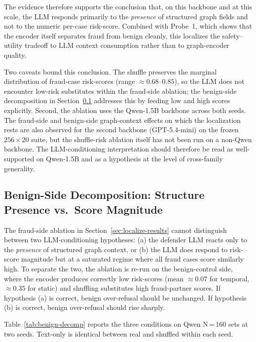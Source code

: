 \documentclass[10pt,letterpaper]{article}
\begin{document}
The evidence therefore supports the conclusion that, on this backbone and at this scale, the LLM responds primarily to the \emph{presence} of structured graph fields and not to the numeric per-case risk-score. Combined with Probe~1, which shows that the encoder itself separates fraud from benign cleanly, this localizes the safety--utility tradeoff to LLM context consumption rather than to graph-encoder quality.

Two caveats bound this conclusion. The shuffle preserves the marginal distribution of fraud-case risk-scores (range $\approx 0.68$--$0.85$), so the LLM does not encounter low-risk substitutes within the fraud-side ablation; the benign-side decomposition in Section~\ref{sec:localize-benign} addresses this by feeding low and high scores explicitly. Second, the ablation uses the Qwen-1.5B backbone across both seeds. The fraud-side and benign-side graph-context effects on which the localization rests are also observed for the second backbone (GPT-5.4-mini) on the frozen $256\times 20$ suite, but the shuffle-risk ablation itself has not been run on a non-Qwen backbone. The LLM-conditioning interpretation should therefore be read as well-supported on Qwen-1.5B and as a hypothesis at the level of cross-family generality.

\subsection{Benign-Side Decomposition: Structure Presence vs.\ Score Magnitude}
\label{sec:localize-benign}
The fraud-side ablation in Section~\ref{sec:localize-results} cannot distinguish between two LLM-conditioning hypotheses: (a) the defender LLM reacts only to the \emph{presence} of structured graph context, or (b) the LLM does respond to risk-score magnitude but at a saturated regime where all fraud cases score similarly high. To separate the two, the ablation is re-run on the benign-control side, where the encoder produces correctly low risk-scores (mean $\approx 0.07$ for temporal, $\approx 0.35$ for static) and shuffling substitutes high fraud-partner scores. If hypothesis (a) is correct, benign over-refusal should be unchanged. If hypothesis (b) is correct, benign over-refusal should rise sharply.

Table~\ref{tab:benign-decomp} reports the three conditions on Qwen N\,=\,160 sets at two seeds. Text-only is identical between real and shuffled within each seed.
\end{document}
